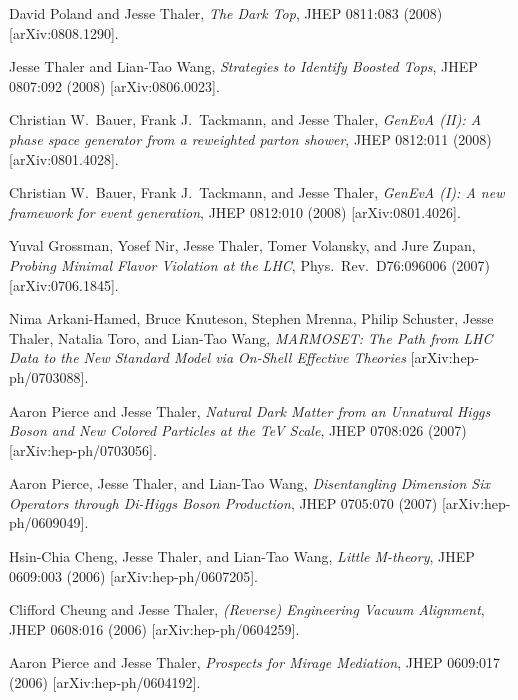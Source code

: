 \begin{list}{[]\addtocounter{jessecount}{-1}}{\leftmargin=3em \itemsep=4pt}
\item
 David Poland and Jesse Thaler,
\emph{The Dark Top},
JHEP 0811:083 (2008)
[arXiv:0808.1290].

\item
 Jesse Thaler and Lian-Tao Wang,
\emph{Strategies to Identify Boosted Tops},
JHEP 0807:092 (2008)
[arXiv:0806.0023].

\item
 Christian W.\ Bauer, Frank J.\ Tackmann, and Jesse Thaler,
\emph{GenEvA (II): A phase space generator from a reweighted parton shower},
JHEP 0812:011 (2008)
[arXiv:0801.4028].

\item
 Christian W.\ Bauer, Frank J.\ Tackmann, and Jesse Thaler,
\emph{GenEvA (I): A new framework for event generation},
JHEP 0812:010 (2008)
[arXiv:0801.4026].

\item
 Yuval Grossman, Yosef Nir, Jesse Thaler, Tomer Volansky, and Jure Zupan,
\emph{Probing Minimal Flavor Violation at the LHC},
Phys.\ Rev.\ D76:096006 (2007)
[arXiv:0706.1845].

\item
 Nima Arkani-Hamed, Bruce Knuteson, Stephen Mrenna, Philip Schuster, Jesse Thaler, Natalia Toro, and Lian-Tao Wang,
\emph{MARMOSET: The Path from LHC Data to the New Standard Model via On-Shell Effective Theories}
[arXiv:hep-ph/0703088].

\item
 Aaron Pierce and Jesse Thaler,
\emph{Natural Dark Matter from an Unnatural Higgs Boson and New Colored Particles at the TeV Scale},
JHEP 0708:026 (2007)
[arXiv:hep-ph/0703056].

\item
 Aaron Pierce, Jesse Thaler, and Lian-Tao Wang,
\emph{Disentangling Dimension Six Operators through Di-Higgs Boson Production},
JHEP 0705:070 (2007)
[arXiv:hep-ph/0609049].

\item
 Hsin-Chia Cheng, Jesse Thaler, and Lian-Tao Wang,
\emph{Little M-theory},
JHEP 0609:003 (2006)
[arXiv:hep-ph/0607205].

\item
 Clifford Cheung and Jesse Thaler,
\emph{(Reverse) Engineering Vacuum Alignment},
JHEP 0608:016 (2006)
[arXiv:hep-ph/0604259].

\item
 Aaron Pierce and Jesse Thaler,
\emph{Prospects for Mirage Mediation},
JHEP 0609:017 (2006)
[arXiv:hep-ph/0604192].


\end{list}
